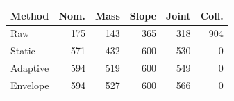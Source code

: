 \begin{tabular}{lrrrrr}
\toprule
Method & Nom. & Mass & Slope & Joint & Coll. \\
\midrule
Raw & 175 & 143 & 365 & 318 & 904 \\
Static & 571 & 432 & 600 & 530 & 0 \\
Adaptive & 594 & 519 & 600 & 549 & 0 \\
Envelope & 594 & 527 & 600 & 566 & 0 \\
\bottomrule
\end{tabular}
